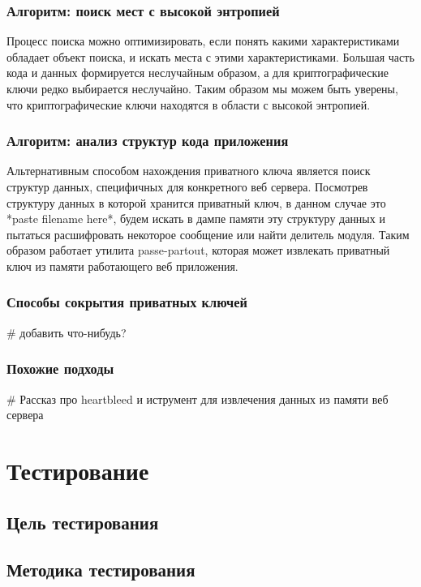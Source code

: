 \documentclass[20pt]{article}
\begin{document}
\subsubsection{Алгоритм: поиск мест с высокой энтропией}
Процесс поиска можно оптимизировать, если понять какими характеристиками обладает
объект поиска, и искать места с этими характеристиками. Большая часть кода и данных
формируется неслучайным образом, а для криптографические ключи редко выбирается
неслучайно. Таким образом мы можем быть уверены, что криптографические ключи находятся
в области с высокой энтропией.

\subsubsection{Алгоритм: анализ структур кода приложения}
Альтернативным способом нахождения приватного ключа является поиск структур
данных, специфичных для конкретного веб сервера. Посмотрев структуру данных в которой
хранится приватный ключ, в данном случае это *paste filename here*, будем искать
в дампе памяти эту структуру данных и пытаться расшифровать некоторое сообщение
или найти делитель модуля. Таким образом работает утилита passe-partout, которая
может извлекать приватный ключ из памяти работающего веб приложения.

\subsubsection{Способы сокрытия приватных ключей}
\# добавить что-нибудь?

\subsubsection{Похожие подходы}
\# Рассказ про heartbleed и иструмент для извлечения данных из памяти веб сервера

\newpage

\section{Тестирование}
\subsection{Цель тестирования}

\subsection{Методика тестирования}
\end{document}
